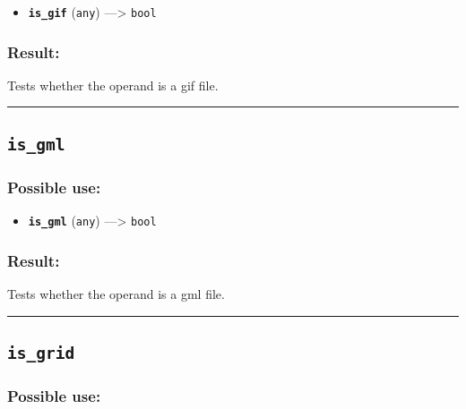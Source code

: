 \documentclass[]{book}
\providecommand{\tightlist}{%
  \setlength{\itemsep}{0pt}\setlength{\parskip}{0pt}}
\theoremstyle{definition}
\theoremstyle{definition}
\theoremstyle{definition}
\theoremstyle{remark}
\begin{document}
\begin{itemize}
\tightlist
\item
  \textbf{\texttt{is\_gif}} (\texttt{any}) ---\textgreater{}
  \texttt{bool}
\end{itemize}

\subsubsection{Result:}\label{result-281}

Tests whether the operand is a gif file.

\begin{center}\rule{0.5\linewidth}{\linethickness}\end{center}

\subsection{\texorpdfstring{\texttt{is\_gml}}{is\_gml}}\label{is_gml}

\subsubsection{Possible use:}\label{possible-use-292}

\begin{itemize}
\tightlist
\item
  \textbf{\texttt{is\_gml}} (\texttt{any}) ---\textgreater{}
  \texttt{bool}
\end{itemize}

\subsubsection{Result:}\label{result-282}

Tests whether the operand is a gml file.

\begin{center}\rule{0.5\linewidth}{\linethickness}\end{center}

\subsection{\texorpdfstring{\texttt{is\_grid}}{is\_grid}}\label{is_grid}

\subsubsection{Possible use:}\label{possible-use-293}
\end{document}
